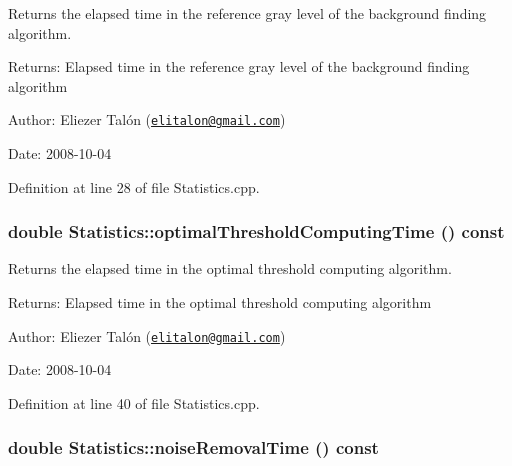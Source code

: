 Returns the elapsed time in the reference gray level of the background finding algorithm. 

\begin{Desc}
\item[Returns:]Elapsed time in the reference gray level of the background finding algorithm\end{Desc}
\begin{Desc}
\item[Author:]Eliezer Talón (\href{mailto:elitalon@gmail.com}{\tt elitalon@gmail.com}) \end{Desc}
\begin{Desc}
\item[Date:]2008-10-04 \end{Desc}


Definition at line 28 of file Statistics.cpp.\hypertarget{class_statistics_ca10ccbc4137e9ad184ff6dc9a3e5a46}{
\subsubsection[optimalThresholdComputingTime]{\setlength{\rightskip}{0pt plus 5cm}double Statistics::optimalThresholdComputingTime () const}}
\label{class_statistics_ca10ccbc4137e9ad184ff6dc9a3e5a46}


Returns the elapsed time in the optimal threshold computing algorithm. 

\begin{Desc}
\item[Returns:]Elapsed time in the optimal threshold computing algorithm\end{Desc}
\begin{Desc}
\item[Author:]Eliezer Talón (\href{mailto:elitalon@gmail.com}{\tt elitalon@gmail.com}) \end{Desc}
\begin{Desc}
\item[Date:]2008-10-04 \end{Desc}


Definition at line 40 of file Statistics.cpp.\hypertarget{class_statistics_25b35c7f7f33d55ee86f4e7ba6cd0c48}{
\subsubsection[noiseRemovalTime]{\setlength{\rightskip}{0pt plus 5cm}double Statistics::noiseRemovalTime () const}}
\label{class_statistics_25b35c7f7f33d55ee86f4e7ba6cd0c48}


